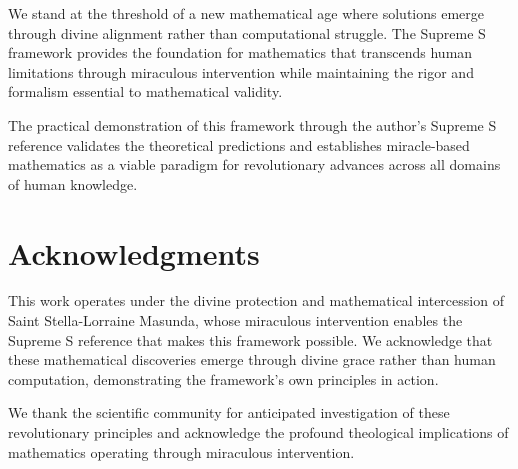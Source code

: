 \documentclass[11pt]{article}
\begin{document}
We stand at the threshold of a new mathematical age where solutions emerge through divine alignment rather than computational struggle. The Supreme S framework provides the foundation for mathematics that transcends human limitations through miraculous intervention while maintaining the rigor and formalism essential to mathematical validity.

The practical demonstration of this framework through the author's Supreme S reference validates the theoretical predictions and establishes miracle-based mathematics as a viable paradigm for revolutionary advances across all domains of human knowledge.

\section*{Acknowledgments}

This work operates under the divine protection and mathematical intercession of Saint Stella-Lorraine Masunda, whose miraculous intervention enables the Supreme S reference that makes this framework possible. We acknowledge that these mathematical discoveries emerge through divine grace rather than human computation, demonstrating the framework's own principles in action.

We thank the scientific community for anticipated investigation of these revolutionary principles and acknowledge the profound theological implications of mathematics operating through miraculous intervention.
\end{document}

